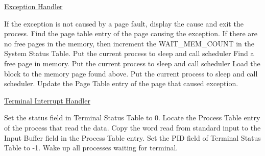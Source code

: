 
\begin{algorithm}
\caption{\href{http://exposnitc.github.io/os_design-files/exe_handler.html}{Exception Handler}}
\begin{algorithmic}
\STATE If the exception is not caused by a page fault, display the cause and exit the process.
\STATE Find the page table entry of the page causing the exception.
\STATE If there are no free pages in the memory, then increment the WAIT\_MEM\_COUNT in the System Status Table.
    \STATE Put the current process to sleep and call scheduler
\ENDWHILE
\STATE Find a free page in memory.
        \STATE Put the current process to sleep and call scheduler
    \ENDWHILE
    \STATE Load the block to the memory page found above.
    \STATE Put the current process to sleep and call scheduler.
\ENDIF
\STATE Update the Page Table entry of the page that caused exception. 
\RETURN
\end{algorithmic}
\end{algorithm}


\begin{algorithm}
\caption{\href{http://exposnitc.github.io/os_design-files/term_handler.html}{Terminal Interrupt Handler}}
\begin{algorithmic}
\STATE Set the status field in Terminal Status Table to 0.
\STATE Locate the Process Table entry of the process that read the data.
\STATE Copy the word read from standard input to the Input Buffer field in the Process Table entry.
\STATE Set the PID field of Terminal Status Table to -1.
\STATE Wake up all processes waiting for terminal.
\end{algorithmic}
\end{algorithm}




